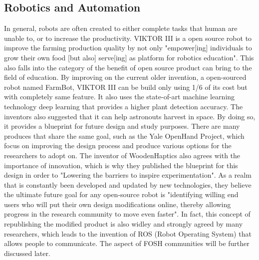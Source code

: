 \documentclass[final-report.tex]{subfiles}
\begin{document}
\subsection{Robotics and Automation}
In general, robots are often created to either complete tasks that human are unable to, or to increase the productivity. 
VIKTOR III is a open source robot to improve the farming production quality by not only "empower[ing] individuals to grow their own food [but also] serve[ing] as platform for robotics education".
This also falls into the category of the benefit of open source product can bring to the field of education. By improving on the current older invention, a open-sourced robot named FarmBot, VIKTOR III can be build only using 1/6 of its cost but with completely same feature. 
It also uses the state-of-art machine learning technology deep learning that provides a higher plant detection accuracy. 
The inventors also suggested that it can help astronouts harvest in space. 
By doing so, it provides a blueprint for future design and study purposes. 
There are many produces that share the same goal, such as the Yale OpenHand Project, which focus on improving the design process and produce various options for the researchers to adopt on. 
The inventor of WoodenHaptics also agrees with the importance of innovation, which is why they published the blueprint for this design in order to "Lowering the barriers to inspire experimentation". 
As a realm that is constantly been developed and updated by new technologies, they believe the ultimate future goal for any open-source robot is "identifying willing end users who will put their own design modifications online, thereby allowing progress in the research community to move even faster". 
In fact, this concept of republishing the modified product is also widley and strongly agreed by many researchers, which leads to the invention of ROS (Robot Operating System) that allows people to communicate. 
The aspect of FOSH communities will be further discussed later. 
\end{document}
